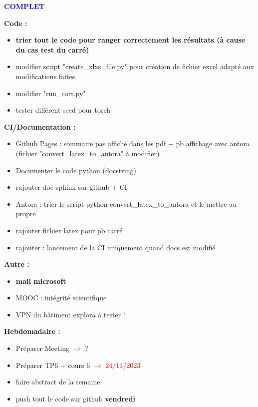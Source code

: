 \textcolor{blue}{\textbf{\large{COMPLET}}}

\textbf{Code :}
\begin{itemize}[label=$\square$] 
	\item[\done] \textbf{trier tout le code pour ranger correctement les résultats (à cause du cas test du carré)}
	\item[\done] modifier script "create\_xlxs\_file.py" pour création de fichier excel adapté aux modifications faites
	\item[\done] modifier "run\_corr.py"
	\item[\wontfix] tester différent seed pour torch
\end{itemize}
\textbf{CI/Documentation :}
\begin{itemize}[label=$\square$] 
	\item[\later] Github Pages : sommaire pas affiché dans les pdf + pb affichage avec antora (fichier "convert\_latex\_to\_antora" à modifier)
	\item[\later] Documenter le code python (docstring)
	\item[\later] rajouter doc sphinx sur github + CI
	\item[\later] Antora : trier le script python convert\_latex\_to\_antora et le mettre au propre
	\item[\later] rajouter fichier latex pour pb carré
	\item[\later] rajouter : lancement de la CI uniquement quand docs est modifié
\end{itemize}
\textbf{Autre :}
\begin{itemize}[label=$\square$] 
	\item[\wontfix] \textbf{mail microsoft}
	\item[\later] MOOC : intégrité scientifique
	\item[\later] VPN du bâtiment explora à tester !
\end{itemize}
\textbf{Hebdomadaire :}
\begin{itemize}[label=$\square$] 
	\item[\wontfix] Préparer Meeting \textcolor{red}{$\rightarrow$ ?}
	\item[\done] Préparer TP6 + cours 6 \textcolor{red}{$\rightarrow$ 24/11/2023}
	\item[\done] faire abstract de la semaine 
	\item[\done] push tout le code sur github \textbf{vendredi}
\end{itemize}
